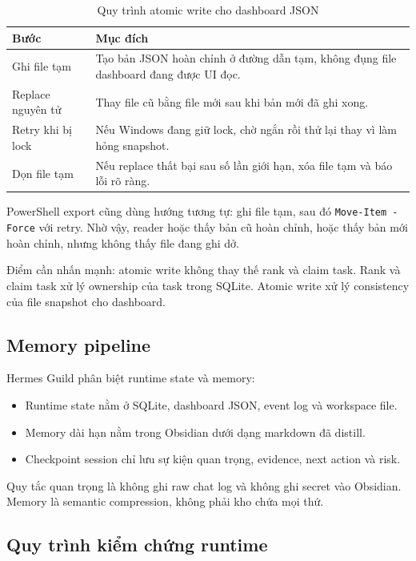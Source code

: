 \documentclass[12pt,a4paper]{article}
\begin{document}
\begin{table}[H]
\centering
\caption{Quy trình atomic write cho dashboard JSON}
\begin{tabular}{p{}p{}}
\toprule
\textbf{Bước} & \textbf{Mục đích} \\
\midrule
Ghi file tạm & Tạo bản JSON hoàn chỉnh ở đường dẫn tạm, không đụng file dashboard đang được UI đọc. \\
Replace nguyên tử & Thay file cũ bằng file mới sau khi bản mới đã ghi xong. \\
Retry khi bị lock & Nếu Windows đang giữ lock, chờ ngắn rồi thử lại thay vì làm hỏng snapshot. \\
Dọn file tạm & Nếu replace thất bại sau số lần giới hạn, xóa file tạm và báo lỗi rõ ràng. \\
\bottomrule
\end{tabular}
\end{table}

PowerShell export cũng dùng hướng tương tự: ghi file tạm, sau đó \texttt{Move-Item -Force} với retry. Nhờ vậy, reader hoặc thấy bản cũ hoàn chỉnh, hoặc thấy bản mới hoàn chỉnh, nhưng không thấy file đang ghi dở.

Điểm cần nhấn mạnh: atomic write không thay thế rank và claim task. Rank và claim task xử lý ownership của task trong SQLite. Atomic write xử lý consistency của file snapshot cho dashboard.

\subsection{Memory pipeline}

Hermes Guild phân biệt runtime state và memory:

\begin{itemize}
    \item Runtime state nằm ở SQLite, dashboard JSON, event log và workspace file.
    \item Memory dài hạn nằm trong Obsidian dưới dạng markdown đã distill.
    \item Checkpoint session chỉ lưu sự kiện quan trọng, evidence, next action và risk.
\end{itemize}

Quy tắc quan trọng là không ghi raw chat log và không ghi secret vào Obsidian. Memory là semantic compression, không phải kho chứa mọi thứ.

\subsection{Quy trình kiểm chứng runtime}
\end{document}
